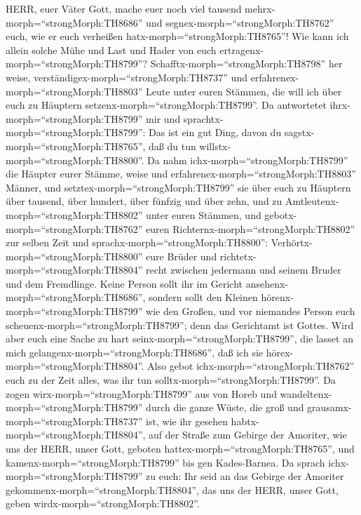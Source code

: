 HERR, euer Väter Gott, mache euer noch viel tausend
mehrx-morph=``strongMorph:TH8686'' und
segnex-morph=``strongMorph:TH8762'' euch, wie er euch verheißen
hatx-morph=``strongMorph:TH8765''!  Wie kann ich allein
solche Mühe und Last und Hader von euch
ertragenx-morph=``strongMorph:TH8799''? 
Schafftx-morph=``strongMorph:TH8798'' her weise,
verständigex-morph=``strongMorph:TH8737'' und
erfahrenex-morph=``strongMorph:TH8803'' Leute unter euren Stämmen, die
will ich über euch zu Häuptern setzenx-morph=``strongMorph:TH8799''.
 Da antwortetet ihrx-morph=``strongMorph:TH8799'' mir und
sprachtx-morph=``strongMorph:TH8799'': Das ist ein gut Ding, davon du
sagstx-morph=``strongMorph:TH8765'', daß du tun
willstx-morph=``strongMorph:TH8800''.  Da nahm
ichx-morph=``strongMorph:TH8799'' die Häupter eurer Stämme, weise und
erfahrenex-morph=``strongMorph:TH8803'' Männer, und
setztex-morph=``strongMorph:TH8799'' sie über euch zu Häuptern über
tausend, über hundert, über fünfzig und über zehn, und zu
Amtleutenx-morph=``strongMorph:TH8802'' unter euren Stämmen,
 und gebotx-morph=``strongMorph:TH8762'' euren
Richternx-morph=``strongMorph:TH8802'' zur selben Zeit und
sprachx-morph=``strongMorph:TH8800'':
Verhörtx-morph=``strongMorph:TH8800'' eure Brüder und
richtetx-morph=``strongMorph:TH8804'' recht zwischen jedermann und
seinem Bruder und dem Fremdlinge.  Keine Person sollt ihr
im Gericht ansehenx-morph=``strongMorph:TH8686'', sondern sollt den
Kleinen hörenx-morph=``strongMorph:TH8799'' wie den Großen, und vor
niemandes Person euch scheuenx-morph=``strongMorph:TH8799''; denn das
Gerichtamt ist Gottes. Wird aber euch eine Sache zu hart
seinx-morph=``strongMorph:TH8799'', die lasset an mich
gelangenx-morph=``strongMorph:TH8686'', daß ich sie
hörex-morph=``strongMorph:TH8804''.  Also gebot
ichx-morph=``strongMorph:TH8762'' euch zu der Zeit alles, was ihr tun
solltx-morph=``strongMorph:TH8799''.  Da zogen
wirx-morph=``strongMorph:TH8799'' aus von Horeb und
wandeltenx-morph=``strongMorph:TH8799'' durch die ganze Wüste, die groß
und grausamx-morph=``strongMorph:TH8737'' ist, wie ihr gesehen
habtx-morph=``strongMorph:TH8804'', auf der Straße zum Gebirge der
Amoriter, wie uns der HERR, unser Gott, geboten
hattex-morph=``strongMorph:TH8765'', und
kamenx-morph=``strongMorph:TH8799'' bis gen Kades-Barnea. 
Da sprach ichx-morph=``strongMorph:TH8799'' zu euch: Ihr seid an das
Gebirge der Amoriter gekommenx-morph=``strongMorph:TH8804'', das uns der
HERR, unser Gott, geben wirdx-morph=``strongMorph:TH8802''.
